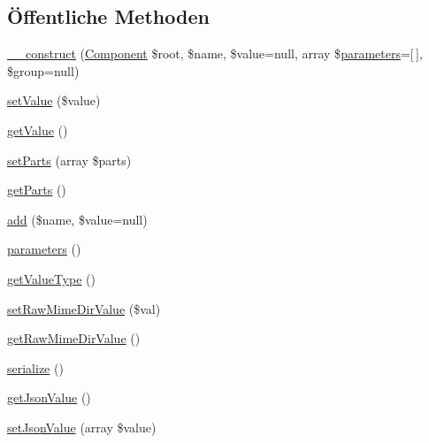 \subsection*{Öffentliche Methoden}
\begin{DoxyCompactItemize}
\item 
\mbox{\hyperlink{class_sabre_1_1_v_object_1_1_property_a68ec843a9bf6b4708d58f0e11265c477}{\+\_\+\+\_\+construct}} (\mbox{\hyperlink{class_sabre_1_1_v_object_1_1_component}{Component}} \$root, \$name, \$value=null, array \$\mbox{\hyperlink{class_sabre_1_1_v_object_1_1_property_a15eeef3d5c2776824cc9b40f1ee18322}{parameters}}=\mbox{[}$\,$\mbox{]}, \$group=null)
\item 
\mbox{\hyperlink{class_sabre_1_1_v_object_1_1_property_ae323a5e508abb9bd96449dc7b09f8bf5}{set\+Value}} (\$value)
\item 
\mbox{\hyperlink{class_sabre_1_1_v_object_1_1_property_a9813d84d8d1f59231f69a729505227a9}{get\+Value}} ()
\item 
\mbox{\hyperlink{class_sabre_1_1_v_object_1_1_property_acbaa8898c7ee61819c53413ee5b92519}{set\+Parts}} (array \$parts)
\item 
\mbox{\hyperlink{class_sabre_1_1_v_object_1_1_property_a1e2e0bf97c73b44b3f5337429abcfe73}{get\+Parts}} ()
\item 
\mbox{\hyperlink{class_sabre_1_1_v_object_1_1_property_a7bd4f6607335ccbe5edd84c804eb523c}{add}} (\$name, \$value=null)
\item 
\mbox{\hyperlink{class_sabre_1_1_v_object_1_1_property_a15eeef3d5c2776824cc9b40f1ee18322}{parameters}} ()
\item 
\mbox{\hyperlink{class_sabre_1_1_v_object_1_1_property_a1c1501c7c11f9c4cbb8368a50be657a3}{get\+Value\+Type}} ()
\item 
\mbox{\hyperlink{class_sabre_1_1_v_object_1_1_property_ab6e883a440998a57a51aa6c4fb65b947}{set\+Raw\+Mime\+Dir\+Value}} (\$val)
\item 
\mbox{\hyperlink{class_sabre_1_1_v_object_1_1_property_ac536713167811c630d88963900814c44}{get\+Raw\+Mime\+Dir\+Value}} ()
\item 
\mbox{\hyperlink{class_sabre_1_1_v_object_1_1_property_a1906505765574000b55838c0e5ca5130}{serialize}} ()
\item 
\mbox{\hyperlink{class_sabre_1_1_v_object_1_1_property_aa1ac2fdc4e178a3a12076751640ffa57}{get\+Json\+Value}} ()
\item 
\mbox{\hyperlink{class_sabre_1_1_v_object_1_1_property_a4052644658d3bac7f0256ffe445f1674}{set\+Json\+Value}} (array \$value)

\end{DoxyCompactItemize}
